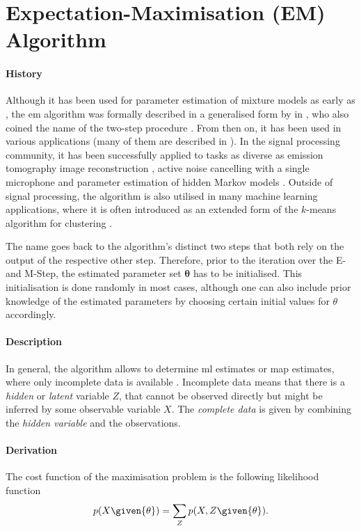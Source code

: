 \section{Expectation-Maximisation (EM) Algorithm}
\label{sec:em}

\paragraph{History}
Although it has been used for parameter estimation of mixture models as early as \citeyear{Newcomb1886} \cite{Newcomb1886}, the \gls{em} algorithm was formally described in a generalised form by \citeauthor{Dempster1977} in \citeyear{Dempster1977}, who also coined the name of the two-step procedure \cite{Dempster1977}. From then on, it has been used in various applications (many of them are described in \cite{McLachlan2008}). In the signal processing community, it has been successfully applied to tasks as diverse as emission tomography image reconstruction \cite{Shepp1982}, active noise cancelling with a single microphone \cite{Feder1989} and parameter estimation of hidden Markov models \cite{Moon1996}. Outside of signal processing, the algorithm is also utilised in many machine learning applications, where it is often introduced as an extended form of the $k$-means algorithm for clustering \cite{Bishop2006}.

The name  goes back to the algorithm's distinct two steps that both rely on the output of the respective other step. Therefore, prior to the iteration over the E- and M-Step, the estimated parameter set $\bm \theta$ has to be initialised. This initialisation is done randomly in most cases, although one can also include prior knowledge of the estimated parameters by choosing certain initial values for $\theta$ accordingly.

\paragraph{Description} In general, the algorithm allows to determine \gls{ml} estimates or \gls{map} estimates, where only incomplete data is available \cite[p.~1]{Dempster1977}. Incomplete data means that there is a \textit{hidden} or \textit{latent} variable $Z$, that cannot be observed directly but might be inferred by some observable variable $X$. The \textit{complete data} is given by combining the \textit{hidden variable} and the observations.

\paragraph{Derivation}
The cost function of the maximisation problem is the following likelihood function
\begin{equation}
    p(X\given{\theta})=\sum_Z p(X,Z\given{\theta}).
\end{equation}

